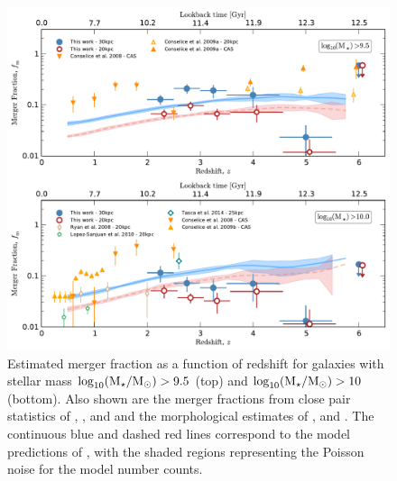 \begin{figure}
\centering
	\includegraphics[width=\columnwidth]{plots/merger_fractions.pdf}
  \caption[Estimated merger fraction as a function of redshift.]{Estimated merger fraction as a function of redshift for galaxies with stellar mass $\log_{10}(\text{M}_{\star} / \text{M}_{\odot}) > 9.5$ (top) and $\log_{10}(\text{M}_{\star} / \text{M}_{\odot}) > 10$ (bottom). Also shown are the merger fractions from close pair statistics of \citet{RyanJr:2008ka}, \citet{2009MNRAS.397..208C}, \citet{LopezSanjuan:2010cz} and \citet{Tasca:2014gz} and the morphological estimates of \citet{Conselice:2008de},  \citet{2009MNRAS.397..208C} and \citet{Conselice:2009fe}. The continuous blue and dashed red lines correspond to the model predictions of \citet{Lu:2011hj,Lu:2014kl}, with the shaded regions representing the Poisson noise for the model number counts.}
  \label{fig:merger_frac}
\end{figure}

